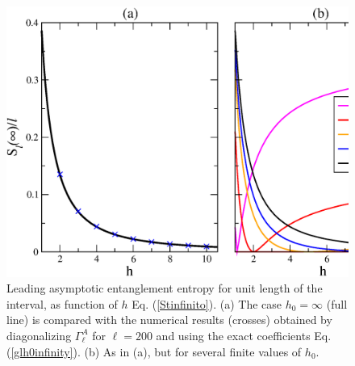 \documentclass[12pt,preprint,tighten,eqsecnum,aps,floats,psfig,epsfig,amsmath,onecolumn]{revtex4-1}
\begin{document}
\begin{figure}[tb]
\centerline{\includegraphics[width=12cm]{SLtinfty.eps}}
\caption{Leading asymptotic entanglement entropy for unit length of the 
interval, as function of $h$ Eq. (\ref{Stinfinito}).
(a) The case $h_0=\infty$ (full line) is compared with the numerical 
results (crosses) obtained by diagonalizing $\Gamma^A_\ell$ for $\ell=200$ 
and using the exact coefficients Eq. (\ref{glh0infinity}). 
(b) As in (a), but for several finite values of $h_0$. }
\label{Stinf}
\end{figure}
\end{document}
